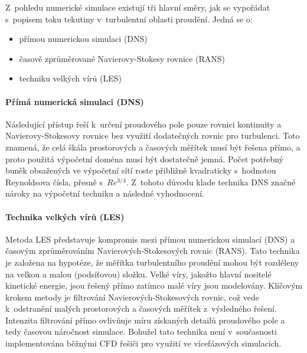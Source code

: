 Z~pohledu numerické simulace existují tři hlavní směry, jak se vypořádat s~popisem toku tekutiny v~turbulentní oblasti proudění. Jedná se o:
\begin{itemize}[itemsep=0pt,parsep=0pt,partopsep=0pt,topsep=0pt]
  \item přímou numerickou simulaci (DNS)
  \item časově zprůměrované Navierovy-Stokesy rovnice (RANS)
  \item techniku velkých vírů (LES)
\end{itemize}

\paragraph{Přímá numerická simulaci (DNS)}
Následující přístup řeší k~určení proudového pole pouze rovnici kontinuity a Navierovy-Stokesovy rovnice bez využití dodatečných rovnic pro turbulenci. Toto znamená, že celá škála prostorových a časových měřítek musí být řešena přímo, a proto použitá výpočetní doména musí být dostatečně jemná. Počet potřebný buněk obsažených ve výpočetní sítí roste přibližně kvadraticky s~hodnotou Reynoldsova čísla, přesně s~$Re^{3/4}$. Z~tohoto důvodu klade technika DNS značné nároky na výpočetní techniku a následné vyhodnocení.

\paragraph{Technika velkých vírů (LES)}
Metoda LES představuje kompromis mezi přímou numerickou simulací (DNS) a časovým zprůměrováním Navierových-Stokesových rovnic (RANS). Tato technika je založena na hypotéze, že měřítka turbulentního proudění mohou být rozděleny na velkou a malou (podsíťovou) složku. Velké víry, jakožto hlavní nositelé kinetické energie, jsou řešený přímo zatímco malé víry jsou modelovány. Klíčovým krokem metody je filtrování Navierových-Stokesových rovnic, což vede k~odstranění malých prostorových a časových měřítek z~výsledného řešení. Intenzita filtrování přímo ovlivňuje míru získaných detailů proudového pole a tedy časovou náročnost simulace. Bohužel tato technika není v~současnosti implementována běžnými CFD řešiči pro využití ve vícefázových simulacích. 

